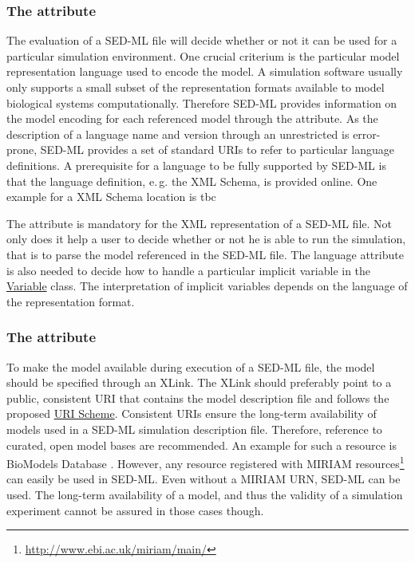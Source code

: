 \subsubsection{The  attribute}
\label{sec:type}
The evaluation of a SED-ML file will decide whether or not it can be used for a particular simulation environment. One crucial criterium is the particular model representation language used to encode the model. A simulation software usually only supports a small subset of the representation formats available to model biological systems computationally. Therefore SED-ML provides information on the model encoding for each referenced model through the  attribute. 
As the description of a language name and version through an unrestricted  is error-prone, SED-ML provides a set of standard URIs to refer to particular language definitions. A prerequisite for a language to be fully supported by SED-ML is that the language definition, e.\,g. the XML Schema, is provided online. One example for a XML Schema location is \url{} \alert{tbc}

The  attribute is mandatory for the XML representation of a SED-ML file. Not only does it help a user to decide whether or not he is able to run the simulation, that is to parse the model referenced in the SED-ML file. The language attribute is also needed to decide how to handle a particular implicit variable in the \hyperref[class:variable]{Variable} class. The interpretation of implicit variables depends on the language of the representation format.


\subsubsection{The  attribute}
\label{sec:source}
To make the model available during  execution of a SED-ML file, the model  should be specified through an XLink. 
The XLink should preferably point to a public, consistent URI that contains the model description file and follows the proposed \hyperref[sec:uriScheme]{URI Scheme}.
Consistent URIs ensure the long-term availability of models used in a SED-ML simulation description file. 
Therefore, reference to curated, open model bases are recommended. An example for such a resource is BioModels Database \citep{N+06}. However, any resource registered with MIRIAM resources\footnote{\url{http://www.ebi.ac.uk/miriam/main/}} can easily be used in SED-ML. Even without a MIRIAM URN, SED-ML can be used. The long-term availability of a model, and thus the validity of a simulation experiment cannot be assured in those cases though.


